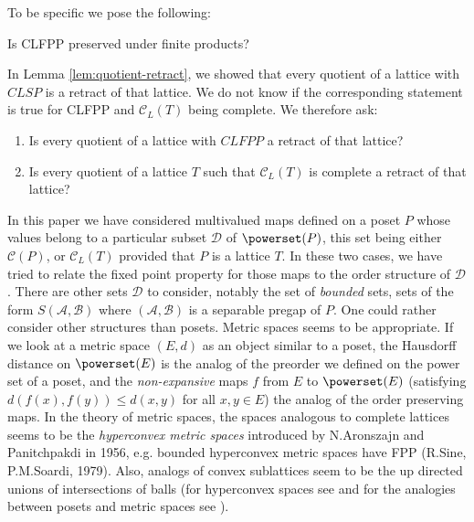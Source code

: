 \documentclass[12pt]{amsart}
\begin{document}
\medskip

To be specific we pose the following:

\begin{problem} 
Is CLFPP preserved under finite products? 
\end{problem} 

In Lemma \ref{lem:quotient-retract}, we showed that every quotient of
a lattice with $CLSP$ is a retract of that lattice. We do not know if
the corresponding  statement is true for CLFPP and $\mathcal C_{L}(T)$ being
complete. We therefore ask:

\begin{problem} 
\begin{enumerate}
\item Is every quotient of a lattice with $CLFPP$  a retract of that lattice?
\item Is every quotient of a lattice $T$ such that $\mathcal C_{L}(T)$ is complete  a retract of that lattice?
\end{enumerate}
\end{problem}

\bigskip

In this paper we have considered multivalued maps defined on a poset
$P$ whose values belong to a particular subset $\mathcal D$ of
$\powerset (P)$, this set being either $\mathcal C (P)$, or $\mathcal
C_L(T)$ provided that $P$ is a lattice $T$. In these two cases, we
have tried to relate the fixed point property for those maps to the
order structure of $\mathcal D$. There are other sets $\mathcal D$ to
consider, notably the set of \emph{bounded} sets, sets of the form
$S(\mathcal A, \mathcal B)$ where $(\mathcal A, \mathcal B)$ is a
separable pregap of $P$. One could rather consider other structures
than posets. Metric spaces seems to be appropriate. If we look at a
metric space $(E,d)$ as an object similar to a poset, the Hausdorff
distance on $\powerset (E)$ is the analog of the preorder we
defined on the power set of a poset, and the \emph{non-expansive} maps
$f$ from $E$ to $ \powerset(E)$ (satisfying $d(f(x),f(y))\leq d(x,y)$
for all $x,y\in E$) the analog of the order preserving maps. In the
theory of metric spaces, the spaces analogous to complete lattices seems to
be the \emph{hyperconvex metric spaces} introduced by N.Aronszajn and
Panitchpakdi in 1956, e.g. bounded hyperconvex metric spaces have FPP
(R.Sine, P.M.Soardi, 1979). Also, analogs of convex sublattices seem
to be the up directed unions of intersections of balls (for
hyperconvex spaces see \cite{kirk} and for the analogies between
posets and metric spaces see \cite{jawhari}).
\end{document}

